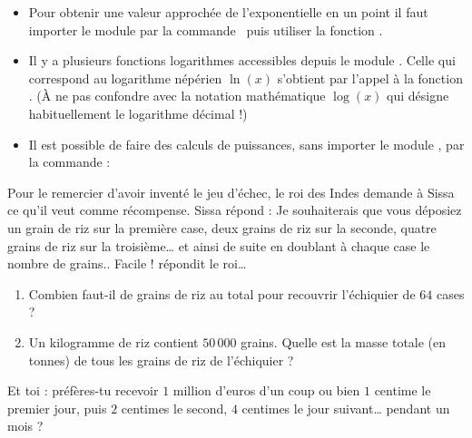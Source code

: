 \documentclass[11pt,class=report,crop=false]{standalone}
\begin{document}
\begin{cours}
\sauteligne
\begin{itemize}
  \item Pour obtenir une valeur approchée de l'exponentielle en un point il faut importer le module  par la commande  \  puis utiliser la fonction .
  
  
  \item Il y a plusieurs fonctions logarithmes accessibles depuis le module . Celle qui correspond au logarithme népérien $\ln(x)$ s'obtient par l'appel à la fonction . (\`A ne pas confondre avec la notation mathématique $\log(x)$ qui désigne habituellement le logarithme décimal !)

  \item Il est possible de faire des calculs de puissances, sans importer le module , par la commande :
  
\end{itemize}

\end{cours}



\bigskip
\bigskip



\begin{activite}

Pour le remercier d'avoir inventé le jeu d'échec, le roi des Indes demande à Sissa ce qu'il veut comme récompense. Sissa répond : \og{}Je souhaiterais que vous déposiez un grain de riz sur la première case, deux grains de riz sur la seconde, quatre grains de riz sur la troisième\ldots{} et ainsi de suite en doublant à chaque case le nombre de grains.\fg{}. \og{}Facile !\fg{} répondit le roi\ldots 
  
  \begin{enumerate}
    \item Combien faut-il de grains de riz au total pour recouvrir l'échiquier de $64$ cases ?
    
    \item Un kilogramme de riz contient $50\,000$ grains. Quelle est la masse totale (en tonnes) de tous les grains de riz de l'échiquier ?
  \end{enumerate}
  
  Et toi : préfères-tu recevoir $1$ million d'euros d'un coup ou bien $1$ centime le premier jour, puis $2$ centimes le second, $4$ centimes le jour suivant\ldots{} pendant un mois ?

\end{activite}
\end{document}
